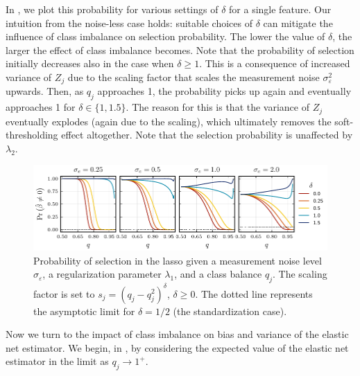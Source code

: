 In , we plot this probability for various settings of
\(\delta\) for a single feature. Our intuition from the noise-less case holds: suitable
choices of \(\delta\) can mitigate the influence of class imbalance on selection
probability. The lower the value of \(\delta\), the larger the effect of class imbalance
becomes. Note that the probability of selection initially decreases also in the case when
\(\delta \geq 1\). This is a consequence of increased variance of \({Z_j}\) due to the
scaling factor that scales the measurement noise \(\sigma_\varepsilon^2\) upwards. Then, as
\(q_j\) approaches 1, the probability picks up again and eventually approaches 1 for
\(\delta \in \{1, 1.5\}\). The reason for this is that the variance of \({Z_j}\) eventually
explodes (again due to the scaling), which ultimately removes the soft-thresholding effect
altogether. Note that the selection probability is unaffected by \(\lambda_2\).

\begin{figure}[htpb]
  \centering
  \includegraphics[]{plots/selection_probability.pdf}
  \caption{%
    Probability of selection in the lasso given a measurement noise level
    \(\sigma_\varepsilon\), a regularization parameter \(\lambda_1\), and a class balance
    \(q_j\). The scaling factor is set to \(s_j = (q_j - q_j^2)^\delta\), \(\delta
    \geq 0\). The dotted line represents the asymptotic limit for \(\delta = 1/2\) (the standardization case). \label{fig:selection-probability}}
\end{figure}

Now we turn to the impact of class imbalance on bias and variance of the elastic net
estimator. We begin, in , by considering the expected value of
the elastic net estimator in the limit as \(q_j \rightarrow 1^+\).

